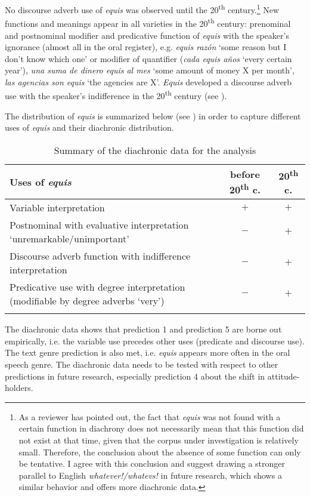 \documentclass[output=paper]{langsci/langscibook}
\begin{document}
No discourse adverb use of \textit{equis} was observed until the 20\textsuperscript{th} century.\footnote{As a reviewer has pointed out, the fact that \textit{equis} was not found with a certain function in diachrony does not necessarily mean that this function did not exist at that time, given that the corpus under investigation is relatively small. Therefore, the conclusion about the absence of some function can only be tentative. I agree with this conclusion and suggest drawing a stronger parallel to English \textit{whatever!/whatevs!} in future research, which shows a similar behavior and offers more diachronic data.}
New functions and meanings appear in all varieties in the 20\textsuperscript{th} century: prenominal and postnominal modifier and predicative function of \textit{equis} with the speaker’s ignorance (almost all in the oral register), e.g. \textit{equis razón} ‘some reason but I don’t know which one’ or modifier of quantifier (\textit{cada equis años} ‘every certain year’), \textit{una suma de dinero equis al mes} ‘some amount of money X per month’, \textit{las agencias son equis} ‘the agencies are X’. \textit{Equis} developed a discourse adverb use with the speaker’s indifference in the 20\textsuperscript{th} century (see ).

The distribution of \textit{equis} is summarized below (see ) in order to capture different uses of \textit{equis} and their diachronic distribution.

\begin{table}
\caption{Summary of the diachronic data for the analysis\label{tab:4:Summary}}
 \begin{tabularx}{\textwidth}{Qcc}
  \lsptoprule
    Uses of \textit{equis} & before 20\textsuperscript{th} c. & 20\textsuperscript{th} c.\\
  \midrule
   Variable interpretation & $+$ & $+$\\\tablevspace
   Postnominal with evaluative interpretation ‘unremarkable/unimportant’ & $-$ & $+$\\\tablevspace
   Discourse adverb function with  indifference interpretation & $-$ & $+$\\\tablevspace
   Predicative use with degree interpretation (modifiable by degree adverbs ‘very’) & $-$ & $+$\\
  \lspbottomrule
 \end{tabularx}
\end{table}

The diachronic data shows that prediction 1 and prediction 5 are borne out empirically, i.e. the variable use precedes other uses (predicate and discourse use). The text genre prediction is also met, i.e. \textit{equis} appears more often in the oral speech genre. The diachronic data needs to be tested with respect to other predictions in future research, especially prediction 4 about the shift in attitude-holders.
\end{document}
